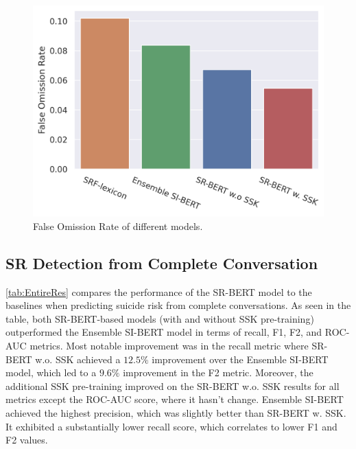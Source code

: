 \documentclass[letterpaper]{article} %
\begin{document}



\begin{figure}[]
\centering
\includegraphics[width=1.05\columnwidth]{figures/Omission_Rate.png} 
\caption{False Omission Rate of different models.}
\label{fig:omission_rate}
\end{figure}


\subsection{SR Detection from Complete Conversation}

\autoref{tab:EntireRes} compares 
the performance of the SR-BERT model to the baselines when predicting suicide risk from complete conversations. 
As seen in the table, both SR-BERT-based models (with and without SSK pre-training) outperformed the Ensemble SI-BERT model in terms of recall, F1, F2, and ROC-AUC metrics. Most notable improvement was in the recall metric where SR-BERT w.o. SSK achieved a $12.5\%$ improvement over the Ensemble SI-BERT model, which led to a $9.6\%$ improvement in the F2 metric. Moreover, the additional SSK pre-training improved on the SR-BERT w.o. SSK results for all metrics except the ROC-AUC score, where it hasn't change. 
Ensemble SI-BERT achieved the highest precision, which was slightly better than SR-BERT w. SSK. It exhibited a substantially lower recall score, which correlates to lower F1 and F2 values. 
\end{document}
